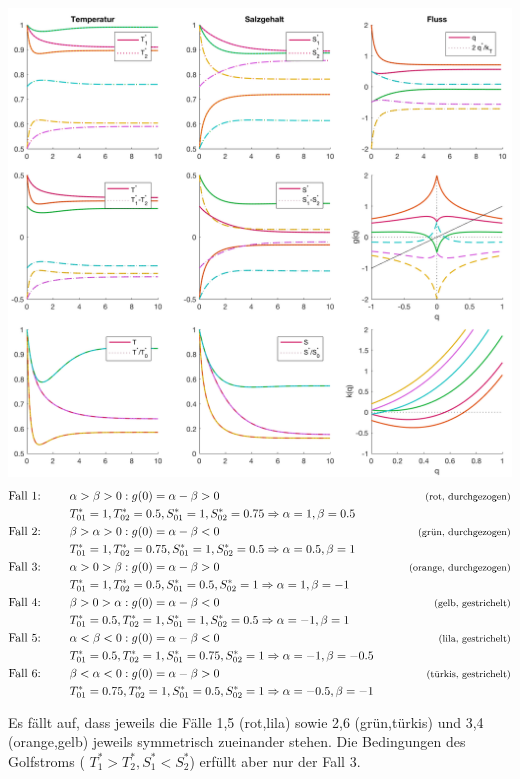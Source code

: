 \documentclass[10pt,a4paper]{article}
\begin{document}
	\begin{center}
	\includegraphics[width=14cm]{Grafik/Fallstudie.png}
	\begin{align*}
		\textrm{Fall 1: } &\qquad \alpha > \beta > 0: g(0) = \alpha - \beta > 0 &\qquad \footnotesize{\textrm{(rot, durchgezogen)}} \\
		&\qquad T^*_{01} = 1, T^*_{02} = 0.5, S^*_{01} = 1, S^*_{02} = 0.75 \Rightarrow \alpha = 1, \beta = 0.5 \\
		\textrm{Fall 2: } &\qquad \beta > \alpha > 0: g(0) = \alpha - \beta < 0 &\qquad \footnotesize{\textrm{(grün, durchgezogen)}} \\
		&\qquad T^*_{01} = 1, T^*_{02} = 0.75, S^*_{01} = 1, S^*_{02} = 0.5 \Rightarrow \alpha = 0.5, \beta = 1 \\
		\textrm{Fall 3: } &\qquad \alpha > 0 > \beta: g(0) = \alpha - \beta > 0 &\qquad \footnotesize{\textrm{(orange, durchgezogen)}} \\
		&\qquad T^*_{01} = 1, T^*_{02} = 0.5, S^*_{01} = 0.5, S^*_{02} = 1 \Rightarrow \alpha = 1, \beta = -1 \\
		\textrm{Fall 4: } &\qquad \beta > 0 > \alpha: g(0) = \alpha - \beta < 0 &\qquad \footnotesize{\textrm{(gelb, gestrichelt)}} \\
		&\qquad T^*_{01} = 0.5, T^*_{02} = 1, S^*_{01} = 1, S^*_{02} = 0.5 \Rightarrow \alpha = -1, \beta = 1 \\
		\textrm{Fall 5: } &\qquad \alpha < \beta < 0: g(0) = \alpha - \beta < 0 &\qquad \footnotesize{\textrm{(lila, gestrichelt)}} \\
		&\qquad T^*_{01} = 0.5, T^*_{02} = 1, S^*_{01} = 0.75, S^*_{02} = 1 \Rightarrow \alpha = -1, \beta = -0.5 \\
		\textrm{Fall 6: } &\qquad \beta < \alpha < 0: g(0) = \alpha - \beta > 0 &\qquad \footnotesize{\textrm{(türkis, gestrichelt)}} \\
		&\qquad T^*_{01} = 0.75, T^*_{02} = 1, S^*_{01} = 0.5, S^*_{02} = 1 \Rightarrow \alpha = -0.5, \beta = -1
	\end{align*}
	\end{center}		
	
	Es fällt auf, dass jeweils die Fälle 1,5 (rot,lila) sowie 2,6 (grün,türkis) und 3,4 (orange,gelb) jeweils symmetrisch zueinander stehen. Die Bedingungen des Golfstroms  ( \(T^*_1 > T^*_2, S^*_1 < S^*_2\)) erfüllt aber nur der Fall 3.
\end{document}
